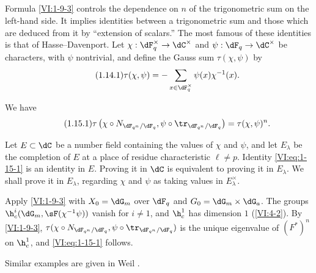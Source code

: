 \documentclass[oneside]{book}
\begin{document}
\subsection{}\label{VI:1-14}

Formula \ref{VI:1-9-3} controls the dependence on $n$ of the trigonometric 
sum on the left-hand side. It implies identities between a 
trigonometric sum and those which are deduced from it by ``extension of 
scalars.'' The most famous of these identities is that of 
Hasse--Davenport. Let $\chi:\dF_q^\times \to \dC^\times$ and 
$\psi:\dF_q\to \dC^\times$ be characters, with $\psi$ nontrivial, and 
define the Gauss sum $\tau(\chi,\psi)$ by 
\begin{equation*}\tag{1.14.1}\label{VI:eq:1-14-1}
  \tau(\chi,\psi) = - \sum_{x\in \dF_q^\times} \psi(x) \chi^{-1}(x) \text{.}
\end{equation*}





\begin{theorem_}\label{VI:1-15}
We have 
\begin{equation*}\tag{1.15.1}\label{VI:eq:1-15-1}
  \tau\left(\chi\circ N_{\dF_{q^n}/\dF_q},\psi\circ \tr_{\dF_{q^n}/\dF_q}\right) = \tau(\chi,\psi)^n \text{.}
\end{equation*}
\end{theorem_}

Let $E\subset \dC$ be a number field containing the values of $\chi$ and 
$\psi$, and let $E_\lambda$ be the completion of $E$ at a place of residue 
characteristic $\ell\ne p$. Identity \eqref{VI:eq:1-15-1} is an identity in 
$E$. Proving it in $\dC$ is equivalent to proving it in $E_\lambda$. We 
shall prove it in $E_\lambda$, regarding $\chi$ and $\psi$ as taking values 
in $E_\lambda^\times$.

Apply \ref{VI:1-9-3} with $X_0=\dG_m$ over $\dF_q$ and 
$G_0=\dG_m\times \dG_a$. The groups $\h_c^i(\dG_m,\sF(\chi^{-1}\psi))$ vanish for 
$i\ne 1$, and $\h_c^1$ has dimension $1$ (\ref{VI:4-2}). By 
\ref{VI:1-9-3}, 
$\tau(\chi\circ N_{\dF_{q^n}/\dF_q},\psi\circ \tr_{\dF_{q^n}/\dF_q})$ is 
the unique eigenvalue of $(F^\ast)^n$ on $\h_c^1$, and \eqref{VI:eq:1-15-1} 
follows. 

Similar examples are given in Weil \cite[App V]{we74}. 





\subsection{}\label{VI:1-16}
\end{document}
